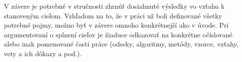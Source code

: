 V závere je potrebné v stručnosti zhrnúť dosiahnuté výsledky vo vzťahu k stanoveným cieľom. 
Vzhľadom na to, že v práci už boli definované všetky potrebné pojmy, možno byť v závere omnoho konkrétnejší ako v úvode. Pri argumentovaní o splnení cieľov je žiaduce odkazovať na konkrétne očíslované alebo inak pomenované časti práce (odseky, algoritmy, metódy, vzorce, vzťahy, vety a ich dôkazy a pod.).
